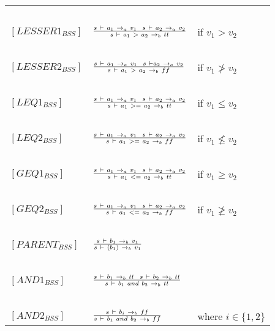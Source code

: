 \begin{table}[h]
\begin{tabular}{|l|l|l|}
			~			&															~																			& ~ \\
	$[LESSER1_{BSS}]$	& $s~\vdash~a_{1}~\rightarrow_{a}~v_{1}~~s~\vdash~a_{2}~
	\rightarrow_{a}~v_{2} \over s~\vdash~a_{1}~>~a_{2}~\rightarrow_{b}~tt$			& if $v_{1} > v_{2}$ \\
			~			&															~																			& ~ \\
	$[LESSER2_{BSS}]$	& $s~\vdash~a_{1}~\rightarrow_{a}~v_{1}~~s~\vdash a_{2}~\rightarrow_{a}~v_{2} \over s~\vdash~a_{1}~>~a_{2}~\rightarrow_{b}~ff$			& if $v_{1} \not> v_{2}$ \\
			~			&															~																			& ~ \\
	$[LEQ1_{BSS}]$		& $s~\vdash~a_{1}~\rightarrow_{a}~v_{1}~~s~\vdash~a_{2}~
	\rightarrow_{a}~v_{2} \over s~\vdash~a_{1}~>=~a_{2}~\rightarrow_{b}~tt$			& if $v_{1} \leq v_{2}$ \\
			~			&															~																			& ~ \\
	$[LEQ2_{BSS}]$		& $s~\vdash~a_{1}~\rightarrow_{a}~v_{1}~~s~\vdash~a_{2}~
	\rightarrow_{a}~v_{2} \over s~\vdash~a_{1}~>=~a_{2}~\rightarrow_{b}~ff$			& if $v_{1} \not\leq v_{2}$ \\
			~			&															~																			& ~ \\
	$[GEQ1_{BSS}]$		& $s~\vdash~a_{1}~\rightarrow_{a}~v_{1}~~s~\vdash~a_{2}~
	\rightarrow_{a}~v_{2} \over s~\vdash~a_{1}~<=~a_{2}~\rightarrow_{b}~tt$			& if $v_{1} \geq v_{2}$ \\
			~			&															~																			& ~ \\
	$[GEQ2_{BSS}]$		& $s~\vdash~a_{1}~\rightarrow_{a}~v_{1}~~s~\vdash~a_{2}~
	\rightarrow_{a}~v_{2} \over s~\vdash~a_{1}~<=~a_{2}~\rightarrow_{b}~ff$			& if $v_{1} \not\geq v_{2}$ \\
			~			&															~																			& ~ \\
	$[PARENT_{BSS}]$	& $s~\vdash~b_{1}~\rightarrow_{b}~v_{1} \over s~\vdash~(b_{1})~\rightarrow_{b}~v_{1}$													& ~ \\
			~			&															~																			& ~ \\
	$[AND1_{BSS}]$		& $s~\vdash~b_{1}~\rightarrow_{b}~tt~~s~\vdash~b_{2}~
	\rightarrow_{b}~tt \over s~\vdash~b_{1}~and~b_{2}~\rightarrow_{b}~tt$				& ~ \\
			~			&															~																			& ~ \\
	$[AND2_{BSS}]$		& $s~\vdash~b_{i}~\rightarrow_{b}~ff \over s~\vdash~b_{1}~and~b_{2}~\rightarrow_{b}~ff$													& where $i \in \{1,2\}$ \\

\end{tabular}
\end{table}
